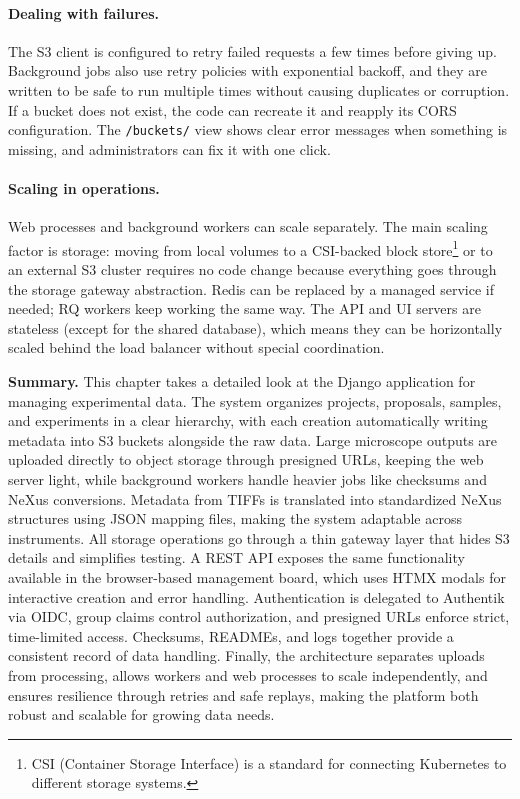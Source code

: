 \paragraph{Dealing with failures.}
The S3 client is configured to retry failed requests a few times before giving up.  
Background jobs also use retry policies with exponential backoff, and they are written to be safe to run multiple times without causing duplicates or corruption.  
If a bucket does not exist, the code can recreate it and reapply its CORS configuration.  
The \texttt{/buckets/} view shows clear error messages when something is missing, and administrators can fix it with one click.

\paragraph{Scaling in operations.}
Web processes and background workers can scale separately.  
The main scaling factor is storage: moving from local volumes to a CSI-backed block store\footnote{CSI (Container Storage Interface) is a standard for connecting Kubernetes to different storage systems.} or to an external S3 cluster requires no code change because everything goes through the storage gateway abstraction.  
Redis can be replaced by a managed service if needed; RQ workers keep working the same way.  
The API and UI servers are stateless (except for the shared database), which means they can be horizontally scaled behind the load balancer without special coordination.


\bigskip

\noindent\textbf{Summary.}
This chapter takes a detailed look at the Django application for managing experimental data. The system organizes projects, proposals, samples, and experiments in a clear hierarchy, with each creation automatically writing metadata into S3 buckets alongside the raw data. Large microscope outputs are uploaded directly to object storage through presigned URLs, keeping the web server light, while background workers handle heavier jobs like checksums and NeXus conversions. Metadata from TIFFs is translated into standardized NeXus structures using JSON mapping files, making the system adaptable across instruments. All storage operations go through a thin gateway layer that hides S3 details and simplifies testing. A REST API exposes the same functionality available in the browser-based management board, which uses HTMX modals for interactive creation and error handling. Authentication is delegated to Authentik via OIDC, group claims control authorization, and presigned URLs enforce strict, time-limited access. Checksums, READMEs, and logs together provide a consistent record of data handling. Finally, the architecture separates uploads from processing, allows workers and web processes to scale independently, and ensures resilience through retries and safe replays, making the platform both robust and scalable for growing data needs.
